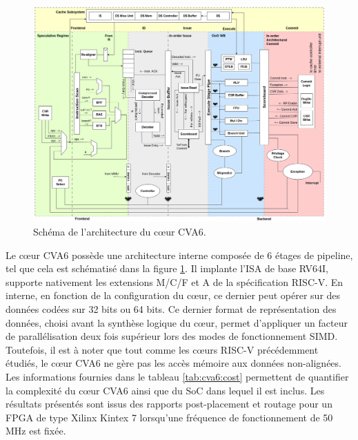 \documentclass[../main.tex]{subfiles}
\begin{document}
\begin{figure}
    \centering
    \includegraphics[scale=0.3]{chapter4/ariane_overview.drawio.png}
    \caption{Schéma de l'architecture du cœur CVA6.}
    \label{figure:cva6}
\end{figure}
Le cœur CVA6 possède une architecture interne composée de 6 étages de pipeline, tel que cela est schématisé dans la figure \ref{figure:cva6}.
Il implante l'ISA de base RV64I, supporte nativement les extensions M/C/F et A de la spécification RISC-V. En interne, en fonction de la configuration du cœur, ce dernier peut opérer sur des données codées sur 32 bits ou 64 bits.
Ce dernier format de représentation des données, choisi avant la synthèse logique du cœur, permet d'appliquer un facteur de parallélisation deux fois supérieur lors des modes de fonctionnement SIMD. Toutefois, il est à noter que tout comme les cœurs RISC-V précédemment étudiés, le cœur CVA6 ne gère pas les accès mémoire aux données non-alignées. Les informations fournies dans le tableau \ref{tab:cva6:cost} permettent de quantifier la complexité du cœur CVA6 ainsi que du SoC dans lequel il est inclus. Les résultats présentés sont issus des rapports post-placement et routage pour un FPGA de type Xilinx Kintex 7 lorsqu'une fréquence de fonctionnement de 50 MHz est fixée.
\end{document}
